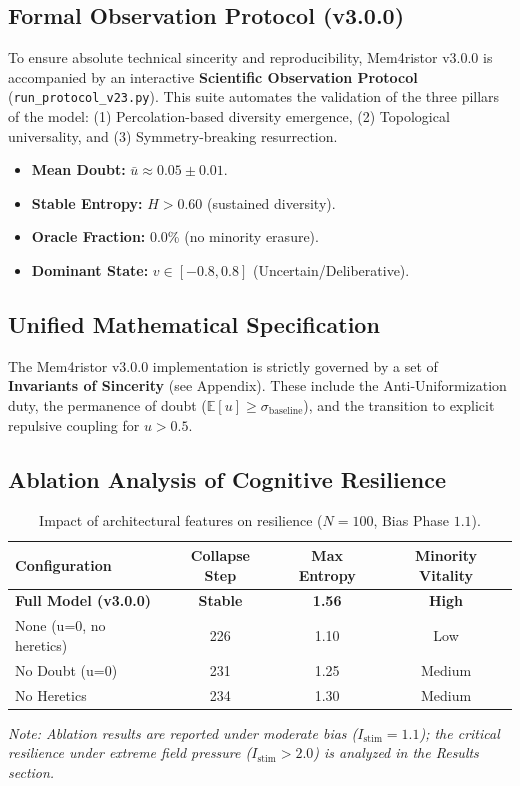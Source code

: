\documentclass[11pt]{article}
\begin{document}
\subsection{Formal Observation Protocol (v3.0.0)}
To ensure absolute technical sincerity and reproducibility, Mem4ristor v3.0.0 is accompanied by an interactive \textbf{Scientific Observation Protocol} (\texttt{run\_protocol\_v23.py}). This suite automates the validation of the three pillars of the model: (1) Percolation-based diversity emergence, (2) Topological universality, and (3) Symmetry-breaking resurrection.
\begin{itemize}
    \item \textbf{Mean Doubt:} $\bar{u} \approx 0.05 \pm 0.01$.
    \item \textbf{Stable Entropy:} $H > 0.60$ (sustained diversity).
    \item \textbf{Oracle Fraction:} 0.0\% (no minority erasure).
    \item \textbf{Dominant State:} $v \in [-0.8, 0.8]$ (Uncertain/Deliberative).
\end{itemize}
\subsection{Unified Mathematical Specification}
The Mem4ristor v3.0.0 implementation is strictly governed by a set of \textbf{Invariants of Sincerity} (see Appendix). These include the Anti-Uniformization duty, the permanence of doubt ($\mathbb{E}[u] \ge \sigma_{\text{baseline}}$), and the transition to explicit repulsive coupling for $u > 0.5$.

\subsection{Ablation Analysis of Cognitive Resilience}
\begin{table}[h]
\centering
\caption{Impact of architectural features on resilience ($N=100$, Bias Phase $1.1$).}
\label{tab:ablations}
\begin{tabular}{lccc}
\toprule
\textbf{Configuration} & \textbf{Collapse Step} & \textbf{Max Entropy} & \textbf{Minority Vitality} \\
\midrule
\textbf{Full Model (v3.0.0)} & \textbf{Stable} & \textbf{1.56} & \textbf{High} \\

None (u=0, no heretics) & 226 & 1.10 & Low \\
No Doubt (u=0) & 231 & 1.25 & Medium \\
No Heretics & 234 & 1.30 & Medium \\
\bottomrule
\end{tabular}
\end{table}
\textit{Note: Ablation results are reported under moderate bias ($I_{\text{stim}} = 1.1$); the critical resilience under extreme field pressure ($I_{\text{stim}} > 2.0$) is analyzed in the Results section.}
\end{document}
